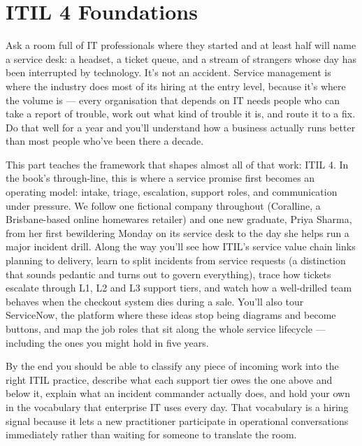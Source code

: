 
\chapter{ITIL 4 Foundations}


Ask a room full of IT professionals where they started and at least half will name a service desk: a headset, a ticket queue, and a stream of strangers whose day has been interrupted by technology. It's not an accident. Service management is where the industry does most of its hiring at the entry level, because it's where the volume is — every organisation that depends on IT needs people who can take a report of trouble, work out what kind of trouble it is, and route it to a fix. Do that well for a year and you'll understand how a business actually runs better than most people who've been there a decade.


This part teaches the framework that shapes almost all of that work: ITIL 4. In the book's through-line, this is where a service promise first becomes an operating model: intake, triage, escalation, support roles, and communication under pressure. We follow one fictional company throughout (Coralline, a Brisbane-based online homewares retailer) and one new graduate, Priya Sharma, from her first bewildering Monday on its service desk to the day she helps run a major incident drill. Along the way you'll see how ITIL's service value chain links planning to delivery, learn to split incidents from service requests (a distinction that sounds pedantic and turns out to govern everything), trace how tickets escalate through L1, L2 and L3 support tiers, and watch how a well-drilled team behaves when the checkout system dies during a sale. You'll also tour ServiceNow, the platform where these ideas stop being diagrams and become buttons, and map the job roles that sit along the whole service lifecycle — including the ones you might hold in five years. \autocite{peoplecert-itil4}


By the end you should be able to classify any piece of incoming work into the right ITIL practice, describe what each support tier owes the one above and below it, explain what an incident commander actually does, and hold your own in the vocabulary that enterprise IT uses every day. That vocabulary is a hiring signal because it lets a new practitioner participate in operational conversations immediately rather than waiting for someone to translate the room.

